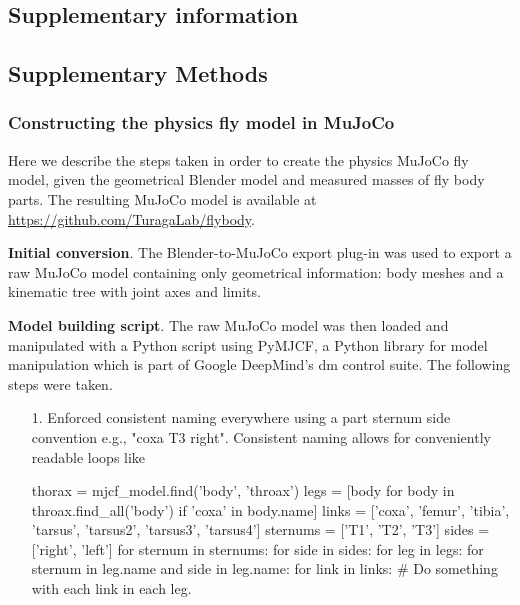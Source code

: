 \documentclass[sn-mathphys-num]{sn-jnl}%
\theoremstyle{thmstyleone}	%
\theoremstyle{thmstyletwo}	%
\theoremstyle{thmstylethree}	%
\begin{document}
\begin{appendices}
	
	
\section{Supplementary information} \label{secInfo}

\subsection{Supplementary Methods}

\subsubsection{Constructing the physics fly model in MuJoCo}

Here we describe the steps taken in order to create the physics MuJoCo fly model, given the geometrical Blender model and measured masses of fly body parts. 
The resulting MuJoCo model is available at \href{https://github.com/TuragaLab/flybody}{https://github.com/TuragaLab/flybody}.


\textbf{Initial conversion}. The Blender-to-MuJoCo export plug-in\cite{tunyasuvunakool2020dm_control} was used to export a raw MuJoCo model containing only geometrical information: 
body meshes and a kinematic tree with joint axes and limits.


\textbf{Model building script}. 
The raw MuJoCo model was then loaded and manipulated with a Python script using PyMJCF, a Python library for model manipulation which is part of Google DeepMind's dm control suite\cite{tunyasuvunakool2020dm_control}. 
The following steps were taken.



\begin{itemize}
	\item[1.] 
	Enforced consistent naming everywhere using a part sternum side convention e.g., "coxa T3 right". 
	Consistent naming allows for conveniently readable loops like
	\begin{python}
	thorax = mjcf_model.find('body', 'throax')
	legs = [body for body in throax.find_all('body') if 'coxa' in body.name]
	links = ['coxa', 'femur', 'tibia', 'tarsus', 'tarsus2', 'tarsus3', 'tarsus4']
	sternums = ['T1', 'T2', 'T3']
	sides = ['right', 'left']
	for sternum in sternums:
 	  for side in sides:
  	    for leg in legs:
    	  for sternum in leg.name and side in leg.name:
	      	for link in links:
	      	# Do something with each link in each leg.
	\end{python}


\end{itemize}
\end{appendices}
\end{document}
